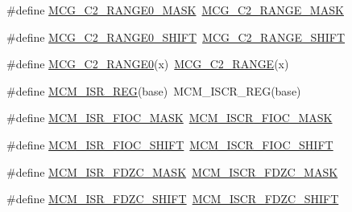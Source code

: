 \begin{DoxyCompactItemize}
\item 
\#define \mbox{\hyperlink{group___s_d_k___compatibility___symbols_ga5436f4e93034d8536c23eabcac1b1a43}{M\+C\+G\+\_\+\+C2\+\_\+\+R\+A\+N\+G\+E0\+\_\+\+M\+A\+SK}}~\mbox{\hyperlink{group___m_c_g___register___masks_ga265bc5e03a60b515a2f554807c106c53}{M\+C\+G\+\_\+\+C2\+\_\+\+R\+A\+N\+G\+E\+\_\+\+M\+A\+SK}}
\item 
\#define \mbox{\hyperlink{group___s_d_k___compatibility___symbols_gaca9dfaea66978e556c7a9773e2c8c531}{M\+C\+G\+\_\+\+C2\+\_\+\+R\+A\+N\+G\+E0\+\_\+\+S\+H\+I\+FT}}~\mbox{\hyperlink{group___m_c_g___register___masks_ga0198b0ee825233bd73c2681c2072e5d6}{M\+C\+G\+\_\+\+C2\+\_\+\+R\+A\+N\+G\+E\+\_\+\+S\+H\+I\+FT}}
\item 
\#define \mbox{\hyperlink{group___s_d_k___compatibility___symbols_ga4717ad2318b6cbc4586d554b59d0382e}{M\+C\+G\+\_\+\+C2\+\_\+\+R\+A\+N\+G\+E0}}(x)~\mbox{\hyperlink{group___m_c_g___register___masks_gaaca8c6b60b8c40403204e606565281d2}{M\+C\+G\+\_\+\+C2\+\_\+\+R\+A\+N\+GE}}(x)
\item 
\#define \mbox{\hyperlink{group___s_d_k___compatibility___symbols_ga699446d7e3330f72de4d6693957b3af7}{M\+C\+M\+\_\+\+I\+S\+R\+\_\+\+R\+EG}}(base)~M\+C\+M\+\_\+\+I\+S\+C\+R\+\_\+\+R\+EG(base)
\item 
\#define \mbox{\hyperlink{group___s_d_k___compatibility___symbols_gaf176751c17ea219168f69770c597d0cd}{M\+C\+M\+\_\+\+I\+S\+R\+\_\+\+F\+I\+O\+C\+\_\+\+M\+A\+SK}}~\mbox{\hyperlink{group___m_c_m___register___masks_ga701558b3e4efc5c15bea4770c14a43ff}{M\+C\+M\+\_\+\+I\+S\+C\+R\+\_\+\+F\+I\+O\+C\+\_\+\+M\+A\+SK}}
\item 
\#define \mbox{\hyperlink{group___s_d_k___compatibility___symbols_gaa386b726e138197bc98ef9d8b6de5fec}{M\+C\+M\+\_\+\+I\+S\+R\+\_\+\+F\+I\+O\+C\+\_\+\+S\+H\+I\+FT}}~\mbox{\hyperlink{group___m_c_m___register___masks_gac6e94708b3e6f09a0355afb3756826fc}{M\+C\+M\+\_\+\+I\+S\+C\+R\+\_\+\+F\+I\+O\+C\+\_\+\+S\+H\+I\+FT}}
\item 
\#define \mbox{\hyperlink{group___s_d_k___compatibility___symbols_ga610f581ddc6b9cc1e4b4847a99509a08}{M\+C\+M\+\_\+\+I\+S\+R\+\_\+\+F\+D\+Z\+C\+\_\+\+M\+A\+SK}}~\mbox{\hyperlink{group___m_c_m___register___masks_ga5ef4e15eaa1fbc668e0e3733f44627fe}{M\+C\+M\+\_\+\+I\+S\+C\+R\+\_\+\+F\+D\+Z\+C\+\_\+\+M\+A\+SK}}
\item 
\#define \mbox{\hyperlink{group___s_d_k___compatibility___symbols_ga3fbed1f99af0d0916feebea373cfbb8b}{M\+C\+M\+\_\+\+I\+S\+R\+\_\+\+F\+D\+Z\+C\+\_\+\+S\+H\+I\+FT}}~\mbox{\hyperlink{group___m_c_m___register___masks_gab5494db259f54a8e5f57134ca2d29516}{M\+C\+M\+\_\+\+I\+S\+C\+R\+\_\+\+F\+D\+Z\+C\+\_\+\+S\+H\+I\+FT}}

\end{DoxyCompactItemize}

